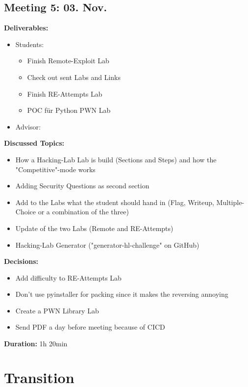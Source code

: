 \subsection*{Meeting 5: 03. Nov.}
\textbf{Deliverables:}
\begin{itemize}
    \item Students:
    \begin{itemize}
        \item Finish Remote-Exploit Lab
        \item Check out sent Labs and Links
        \item Finish RE-Attempts Lab
        \item POC für Python PWN Lab
    \end{itemize}
    \item Advisor:
\end{itemize} 
\textbf{Discussed Topics:}
\begin{itemize}
    \item How a Hacking-Lab Lab is build (Sections and Steps) and how the "Compe\-titive"-mode works
    \item Adding Security Questions as second section
    \item Add to the Labs what the student should hand in (Flag, Writeup, Multiple-Choice or a combination of the three)
    \item Update of the two Labs (Remote and RE-Attempts)
    \item Hacking-Lab Generator ("generator-hl-challenge" on GitHub)
\end{itemize}
\textbf{Decisions:}
\begin{itemize}
    \item Add difficulty to RE-Attempts Lab
    \item Don't use pyinstaller for packing since it makes the reversing annoying
    \item Create a PWN Library Lab
    \item Send PDF a day before meeting because of CICD
\end{itemize}
\textbf{Duration:} 1h 20min

\section{Transition}
